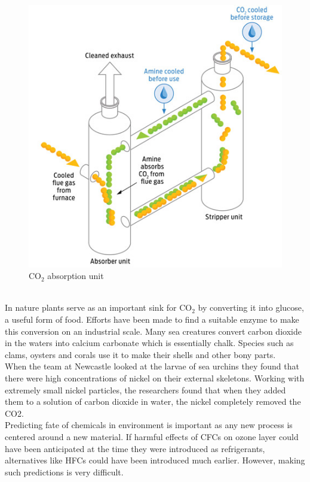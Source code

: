 \documentclass[pdftex,12pt,a4paper]{article}
\begin{document}
\begin{figure}[htb]
\centering
\includegraphics[scale=0.5]{4mari2.jpg}
\caption{CO$_2$ absorption unit}
\end{figure}
\\

In nature plants serve as an important sink for CO$_2$ by converting it into glucose, a useful form of food. Efforts have been made to find a suitable enzyme to make this conversion on an industrial scale. Many sea creatures convert carbon dioxide in the waters into calcium carbonate which is essentially chalk. Species such as clams, oysters and corals use it to make their shells and other bony parts. \\

When the team at Newcastle looked at the larvae of sea urchins they found that there were high concentrations of nickel on their external skeletons.
Working with extremely small nickel particles, the researchers found that when they added them to a solution of carbon dioxide in water, the nickel completely removed the CO2. \\

Predicting fate of chemicals in environment is important as any new process is centered around a new material. If harmful effects of CFCs on ozone layer could have been anticipated at the time they were introduced as refrigerants, alternatives like HFCs could have been introduced much earlier. However, making such predictions is very difficult.\\
\end{document}
